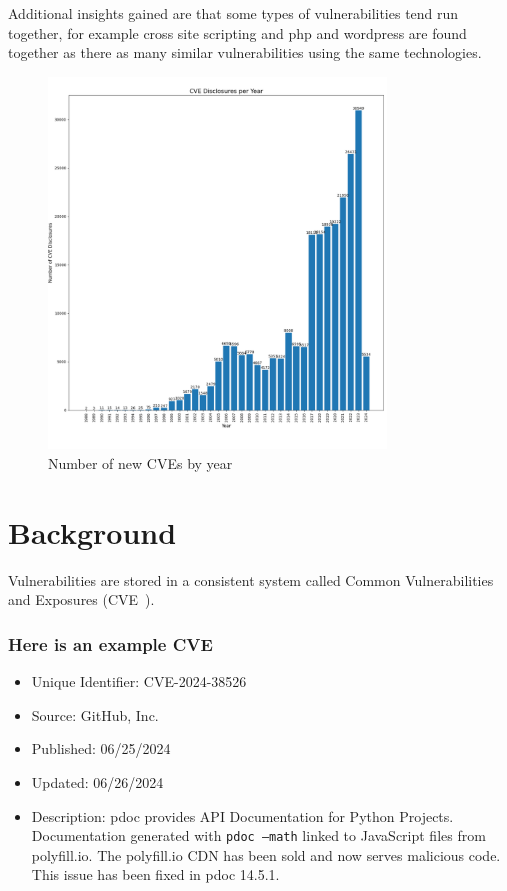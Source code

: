 \documentclass[12pt]{article}
\begin{document}
Additional insights gained are that some types of vulnerabilities
tend run together, for example cross site scripting and php and wordpress are found together as
there as many similar vulnerabilities using the same technologies.


\begin{figure}[h] \centering
	\includegraphics[width=0.8\textwidth]{figures/cves_year.pdf}
	\caption{\label{fig:cve_year}Number of new CVEs by year}
\end{figure}


\section{Background}

Vulnerabilities are stored in a consistent system called Common Vulnerabilities and
Exposures (CVE~\cite{CVE}).

\subsubsection*{Here is an example CVE}
\begin{itemize}
	\item   Unique Identifier: CVE-2024-38526
	\item   Source: GitHub, Inc.
	\item   Published: 06/25/2024
	\item   Updated: 06/26/2024

	\item   Description: pdoc provides API Documentation for Python Projects. Documentation
	      generated with \texttt{pdoc --math} linked to JavaScript files from polyfill.io. The polyfill.io
	      CDN has been sold and now serves malicious code. This issue has been fixed in pdoc 14.5.1.

\end{itemize}
\end{document}
